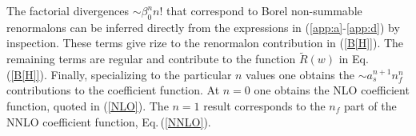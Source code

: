 The factorial divergences  $\sim \beta_0^n  n!$ that correspond to Borel non-summable renormalons 
can be inferred directly from the expressions in (\ref{app:a}-\ref{app:d}) by inspection. 
These terms give rize to the renormalon contribution in (\ref{B[H]}). The remaining terms are regular and 
contribute to the function $\widetilde R(w)$ in Eq.\,(\ref{B[H]}). 
Finally, specializing to the particular $n$ values one obtains the $\sim a_s^{n+1}n_f^n$ contributions to the coefficient function. 
At $n=0$ one obtains the NLO coefficient function, quoted in (\ref{NLO}). 
The $n=1$ result corresponds to the $n_f$ part of the NNLO coefficient function, Eq.\,(\ref{NNLO}).

%

